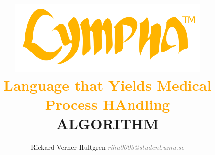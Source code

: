 \documentclass[15pt,a4paper,oneside]{article}
\begin{document}
\title{\vspace{-3cm}
{\includegraphics[width=0.75\textwidth]{logo.png}}\vspace{-0.6cm}\\ \textcolor{orange}{\large{\sc Language} {that} {\sc Yields Medical Process HAndling}}\vspace{0.3cm}\\{\Huge {\bf ALGORITHM}}}
\author{\vspace{-0cm}Rickard Verner Hultgren \textit{\textcolor{grey}{rihu0003@student.umu.se}}\\\\
}
\end{document}
